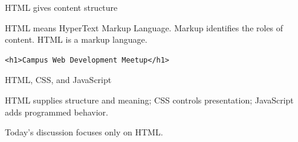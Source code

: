 \documentclass[aspectratio=169,12pt]{beamer}
\begin{document}
\begin{frame}[fragile]{HTML gives content structure}
\begin{conceptblock}
HTML means HyperText Markup Language. Markup identifies the roles of content. HTML is a markup language.
\end{conceptblock}
\begin{lstlisting}
<h1>Campus Web Development Meetup</h1>
\end{lstlisting}

\end{frame}

\begin{frame}{HTML, CSS, and JavaScript}
\begin{conceptblock}
HTML supplies structure and meaning; CSS controls presentation; JavaScript adds programmed behavior.
\end{conceptblock}
\medskip
Today's discussion focuses only on HTML.
\end{frame}
\end{document}
